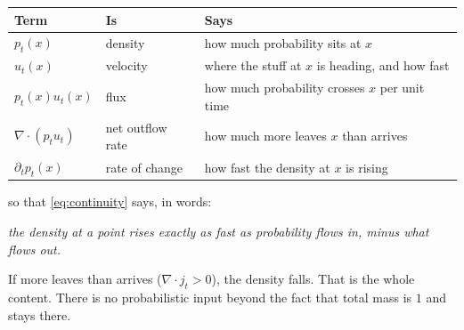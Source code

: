 \documentclass[11pt,a4paper]{report}
\theoremstyle{definition}
\theoremstyle{remark}
\begin{document}
\begin{center}
\begin{tabular}{lll}
\toprule
Term & Is & Says \\
\midrule
$p_t(x)$ & density & how much probability sits at $x$ \\
$u_t(x)$ & velocity & where the stuff at $x$ is heading, and how fast \\
$p_t(x)u_t(x)$ & flux & how much probability crosses $x$ per unit time \\
$\nabla\cdot(p_tu_t)$ & net outflow rate & how much more leaves $x$ than arrives \\
$\partial_tp_t(x)$ & rate of change & how fast the density at $x$ is rising \\
\bottomrule
\end{tabular}
\end{center}

so that \eqref{eq:continuity} says, in words:

\begin{center}
\emph{the density at a point rises exactly as fast as probability
flows in, minus what flows out.}
\end{center}

If more leaves than arrives ($\nabla\cdot j_t>0$), the density falls. That
is the whole content. There is no probabilistic input beyond the fact that
total mass is $1$ and stays there.
\end{document}

